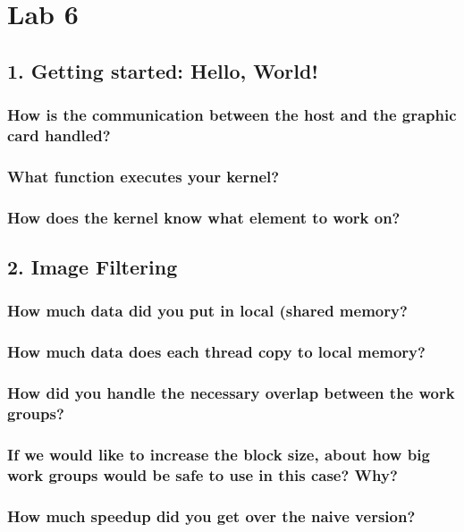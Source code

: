 \documentclass[a4paper,12pt]{article}
\begin{document}
\section{Lab 6}


\subsection{1. Getting started: Hello, World!}

\subsubsection{How is the communication between the host and the graphic card handled?}

\subsubsection{What function executes your kernel?}

\subsubsection{How does the kernel know what element to work on?}



\subsection{2. Image Filtering}

\subsubsection{How much data did you put in local (shared memory?}

\subsubsection{How much data does each thread copy to local memory?}

\subsubsection{How did you handle the necessary overlap between the work groups?}

\subsubsection{If we would like to increase the block size, about how big work groups would be safe to use in this case? Why?}

\subsubsection{How much speedup did you get over the naive version?}
\end{document}
